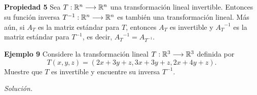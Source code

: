 \subsection{}

\begin{frame}%
	
	\begin{prop}{\textbf{Propiedad 5}}
		\justifying
		Sea $T:\mathbb{R}^n\longrightarrow\mathbb{R}^n$ una transformación lineal invertible. Entonces su función inversa $T^{-1}:\mathbb{R}^n\longrightarrow\mathbb{R}^n$ es también una transformación lineal. Más aún, si $A_T$ es la matriz estándar para $T$, entonces $A_T$ es invertible y ${A_T}^{-1}$ es la matriz estándar para $T^{-1}$, es decir, ${A_T}^{-1}=A_{T^{-1}}$.
	\end{prop}	
	
	\begin{ej}{\textbf{Ejemplo 9}}
		\justifying
		Considere la transformación lineal $T:\mathbb{R}^3\longrightarrow\mathbb{R}^3$ definida por
		\[
			T(x,y,z) = (2x+3y+z,3x+3y+z,2x+4y+z).	
		\]		
		Muestre que $T$ es invertible y encuentre su inversa $T^{-1}$.
	\end{ej}
	\textit{Solución.}
	
\end{frame}
